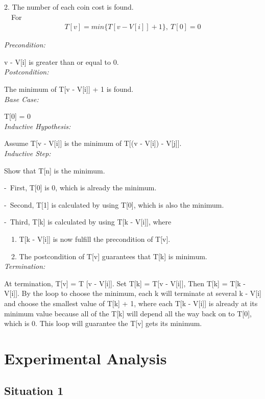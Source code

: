 \documentclass[11pt]{scrreprt}
\begin{document}
2. The number of each coin cost is found.\\

\ \ For
\begin{eqnarray*}
T[v] = min\{T[v - V[i]] + 1\},\ T[0] = 0
\end{eqnarray*}

\emph{Precondition:}

v - V[i] is greater than or equal to 0.\\

\emph{Postcondition:}

The minimum of T[v - V[i]] + 1 is found.\\

\emph{Base Case:}

T[0] = 0\\

\emph{Inductive Hypothesis:}

Assume T[v - V[i]] is the minimum of T[(v - V[i]) - V[j]].\\

\emph{Inductive Step:}

Show that T[n] is the minimum.

-\ First, T[0] is 0, which is already the minimum.

-\ Second, T[1] is calculated by using T[0], which is also the minimum.

-\ Third, T[k] is calculated by using T[k - V[i]], where

\ \ 1. T[k - V[i]] is now fulfill the precondition of T[v].

\ \ 2. The postcondition of T[v] guarantees that T[k] is minimum.\\

\emph{Termination:}

At termination, T[v] = T [v - V[i]]. Set T[k] = T[v - V[i]], Then T[k] = T[k - V[i]]. By the loop to choose the minimum, each k will terminate at several k - V[i] and choose the smallest value of T[k] + 1, where each T[k - V[i]] is already at its minimum value because all of the T[k] will depend all the way back on to T[0], which is 0. This loop will guarantee the T[v] gets its minimum.


\chapter{Experimental Analysis}

\section{Situation 1}
\end{document}
